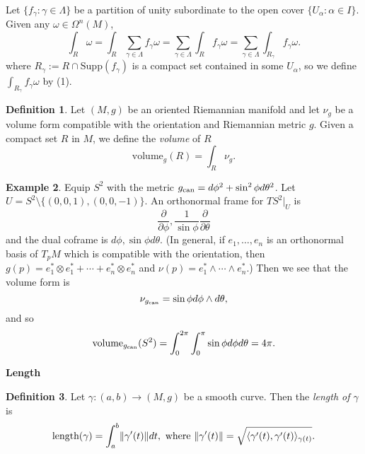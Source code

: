 \documentclass{amsart}
\numberwithin{equation}{section}
\theoremstyle{definition}
\newtheorem{definition}{Definition} [section]
\newtheorem{example}[definition]{Example}
\theoremstyle{theorem}
\begin{document}
Let $\{ f_\gamma: \gamma\in \Lambda\}$ be a partition of unity subordinate to the open cover $\{ U_\alpha:\alpha\in I\}$. 
Given any $\omega\in \Omega^n(M)$, 
$$
\int_R \omega = \int_R \sum_{\gamma\in \Lambda} f_\gamma \omega
=\sum_{\gamma\in \Lambda} \int_R f_\gamma \omega = \sum_{\gamma\in \Lambda} \int_{R_\gamma} f_\gamma \omega.
$$
where $R_\gamma:= R\cap \mathrm{Supp}(f_\gamma)$ is a compact set contained in some $U_\alpha$, so 
we define $\int_{R_\gamma} f_\gamma\omega$ by (1). 


\begin{definition}
Let $(M,g)$ be an oriented Riemannian manifold and let $\nu_g$ be a volume form compatible with the orientation and Riemannian metric $g$.
Given a compact set $R$ in $M$, we define the {\em volume} of $R$  
\[
\text{volume}_g(R) = \int_R \nu_g. 
\]
\end{definition}


\begin{example}
Equip $S^2$ with the metric $g_{\textup{can}} = d\phi^2 + \sin^2\phi d\theta^2$. 
Let $U= S^2\setminus \{(0,0,1),(0,0,-1)\}$. An orthonormal frame for $TS^2|_U$  is 
\[
\frac{\partial}{\partial \phi}, \frac{1}{\sin\phi}\frac{\partial}{\partial \theta}
\]
and the dual coframe is $d\phi, \sin\phi d\theta$. (In general, if $e_1, \ldots, e_n$ is an orthonormal basis of $T_pM$ which is compatible with the orientation, then $g(p) = e_1^* \otimes e_1^* + \cdots + e_n^* \otimes e_n^*$ and $\nu(p) = e_1^* \wedge \cdots \wedge e_n^*$.) 
Then we see that the volume form is 
\[
\nu_{g_\textup{can}} = \sin\phi d\phi \wedge d\theta,
\]
and so 
\[
\text{volume}_{g_\textup{can}}(S^2) = \int_0^{2\pi} \int_0^{\pi} \sin\phi d\phi d\theta = 4\pi. 
\]
\end{example}

\noindent
{\bf \large Length}

\begin{definition}
Let $\gamma : (a,b) \to (M,g)$ be a smooth curve. Then the {\em length of $\gamma$} is 
\[
\text{length}(\gamma) = \int_a^b \lVert \gamma'(t) \rVert dt,
\textup{ where } \lVert \gamma'(t) \rVert =
 \sqrt{\langle \gamma'(t),\gamma'(t)\rangle_{\gamma(t)} }.
\]
\end{definition}
\end{document}
